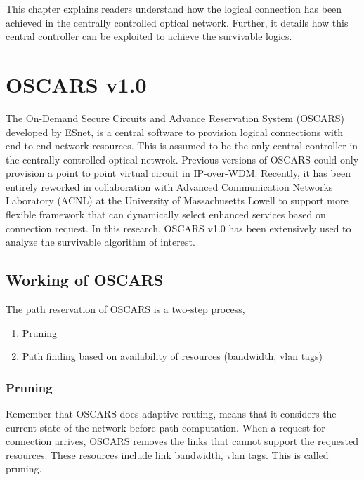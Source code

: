 
\noindent 

This chapter explains readers understand how the logical connection has been achieved in the centrally controlled optical network. Further, it details how this central controller can be exploited to achieve the survivable logics.
 
\section{OSCARS v1.0}\label{spec:oscars} 

The On-Demand Secure Circuits and Advance Reservation System (OSCARS) developed by ESnet, is a central software to provision logical connections with end to end network resources. This is assumed to be the only central controller in the centrally controlled optical netwrok. Previous versions of OSCARS could only provision a point to point virtual circuit in IP-over-WDM. Recently, it has been entirely reworked in collaboration with Advanced Communication Networks Laboratory (ACNL) at the University of Massachusetts Lowell to support more flexible framework that can dynamically select enhanced services based on connection request. In this research, OSCARS v1.0 has been extensively used to analyze the survivable algorithm of interest.
 

\subsection{Working of OSCARS}
The path reservation of OSCARS is a two-step process,
\begin{enumerate}[leftmargin=*]
\item Pruning
\item Path finding based on availability of resources (bandwidth, vlan tags)
\end{enumerate}

\subsubsection{Pruning}
Remember that OSCARS does adaptive routing, means that it considers the current state of the network before path computation. When a request for connection arrives, OSCARS removes the links that cannot support the requested resources. These resources include link bandwidth, vlan tags. This is called pruning.

